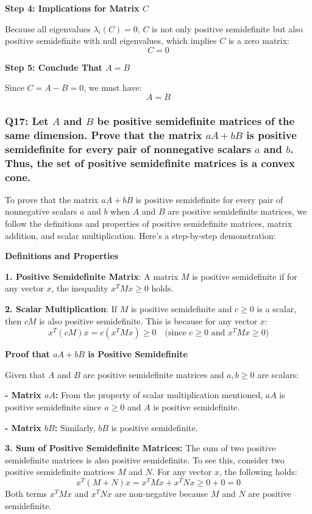 \documentclass[8pt]{article}
\begin{document}
{\textbf{Step 4: Implications for Matrix \(C\)}

Because all eigenvalues \(\lambda_i(C) = 0\), \(C\) is not only positive semidefinite but also positive semidefinite with null eigenvalues, which implies \(C\) is a zero matrix:
\[
C = 0
\]

\textbf{Step 5: Conclude That \(A = B\)}

Since \(C = A - B = 0\), we must have:
\[
A = B
\]


\subsubsection*{Q17: Let \(A\) and \(B\) be positive semidefinite matrices of the same dimension. Prove that the matrix \(aA + bB\) is positive semidefinite for every pair of nonnegative scalars \(a\) and \(b\). Thus, the set of positive semidefinite matrices is a convex cone.}

To prove that the matrix \(aA + bB\) is positive semidefinite for every pair of nonnegative scalars \(a\) and \(b\) when \(A\) and \(B\) are positive semidefinite matrices, we follow the definitions and properties of positive semidefinite matrices, matrix addition, and scalar multiplication. Here's a step-by-step demonstration:

\textbf{Definitions and Properties}

\textbf{1. Positive Semidefinite Matrix}:
   A matrix \(M\) is positive semidefinite if for any vector \(x\), the inequality \(x^T M x \geq 0\) holds.

\textbf{2. Scalar Multiplication}:
   If \(M\) is positive semidefinite and \(c \geq 0\) is a scalar, then \(cM\) is also positive semidefinite. This is because for any vector \(x\):
   \[
   x^T (cM) x = c(x^T M x) \geq 0 \quad \text{(since \(c \geq 0\) and \(x^T M x \geq 0\))}
   \]

\textbf{Proof that \(aA + bB\) is Positive Semidefinite}

Given that \(A\) and \(B\) are positive semidefinite matrices and \(a, b \geq 0\) are scalars:

\textbf{- Matrix \(aA\):} From the property of scalar multiplication mentioned, \(aA\) is positive semidefinite since \(a \geq 0\) and \(A\) is positive semidefinite.

\textbf{- Matrix \(bB\):} Similarly, \(bB\) is positive semidefinite.

\textbf{3. Sum of Positive Semidefinite Matrices:}
   The sum of two positive semidefinite matrices is also positive semidefinite. To see this, consider two positive semidefinite matrices \(M\) and \(N\). For any vector \(x\), the following holds:
   \[
   x^T (M + N) x = x^T M x + x^T N x \geq 0 + 0 = 0
   \]
   Both terms \(x^T M x\) and \(x^T N x\) are non-negative because \(M\) and \(N\) are positive semidefinite.

}
\end{document}
